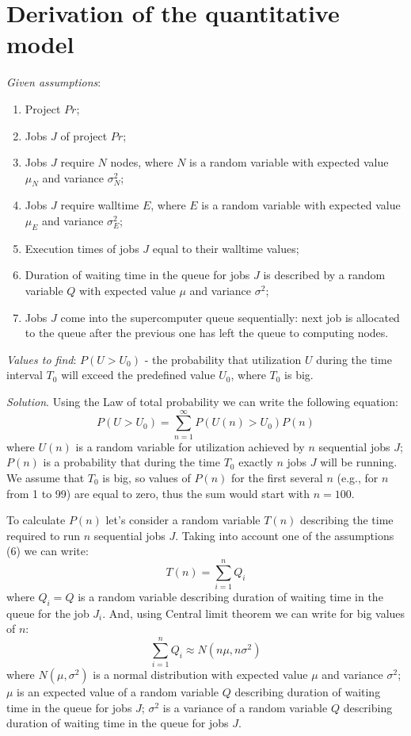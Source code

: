 \section{Derivation of the quantitative model} \label{appendix-model-derivation}

\textit{Given assumptions}:
\begin{enumerate}
    \item Project $Pr$;
    \item Jobs $J$ of project $Pr$;
    \item Jobs $J$ require $N$ nodes, where $N$ is a random variable with expected value $\mu_{N}$ and variance $\sigma_{N}^2$;
    \item Jobs $J$ require walltime $E$, where $E$ is a random variable with expected value $\mu_{E}$ and variance $\sigma_{E}^2$;
    \item Execution times of jobs $J$ equal to their walltime values;
    \item Duration of waiting time in the queue for jobs $J$ is described by a random variable $Q$ with expected value $\mu$ and variance $\sigma^2$;
    \item Jobs $J$ come into the supercomputer queue sequentially: next job is allocated to the queue after the previous one has left the queue to computing nodes.
\end{enumerate}
\textit{Values to find}:
$P(U > U_0)$ - the probability that utilization $U$ during the time interval $T_0$ will exceed the predefined value $U_0$, where $T_0$ is big.

\textit{Solution}.
Using the Law of total probability we can write the following equation:
\begin{equation}
    \label{eq-1}
    P(U > U_0) = \sum\limits_{n=1}^{\infty}P(U(n) > U_0) P(n)
\end{equation}
where $U(n)$ is a random variable for utilization achieved by $n$ sequential jobs $J$; $P(n)$ is a probability that during the time $T_0$ exactly $n$ jobs $J$ will be running. We assume that $T_0$ is big, so values of $P(n)$ for the first several $n$ (e.g., for $n$ from 1 to 99) are equal to zero, thus the sum would start with $n=100$.

To calculate $P(n)$ let's consider a random variable $T(n)$ describing the time required to run $n$ sequential jobs $J$. Taking into account one of the assumptions (6) we can write:
\begin{equation}
    \label{eq-2}
    T(n) = \sum\limits_{i=1}^{n}Q_{i}
\end{equation}
where $Q_{i} = Q$ is a random variable describing duration of waiting time in the queue for the job $J_{i}$. And, using Central limit theorem we can write for big values of $n$:
\begin{equation}
    \label{eq-3}
    \sum\limits_{i=1}^{n}Q_{i} \approx N(n\mu, n\sigma^2)
\end{equation}
where $N(\mu, \sigma^2)$ is a normal distribution with expected value $\mu$ and variance $\sigma^2$; $\mu$ is an expected value of a random variable $Q$ describing duration of waiting time in the queue for jobs $J$; $\sigma^2$ is a variance of a random variable $Q$ describing duration of waiting time in the queue for jobs $J$.

